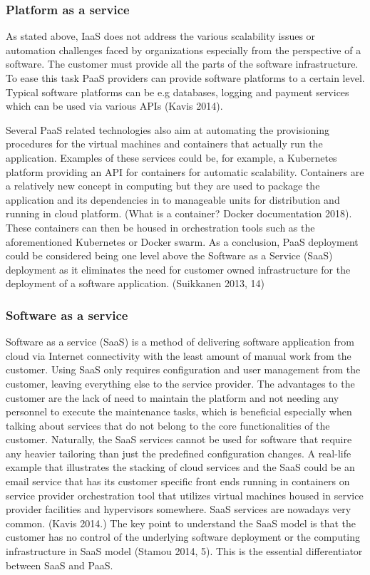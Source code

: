\documentclass{article}
\begin{document}
\subsubsection{Platform as a service}
As stated above, IaaS does not address the various scalability issues or automation challenges faced by organizations especially from the perspective of a software. The customer must provide all the parts of the software infrastructure. To ease this task PaaS providers can provide software platforms to a certain level. Typical software platforms can be e.g databases, logging and payment services which can be used via various APIs (Kavis 2014).
\par
Several PaaS related technologies also aim at automating the provisioning procedures for the virtual machines and containers that actually run the application. Examples of these services could be, for example, a Kubernetes platform providing an API for containers for automatic scalability. Containers are a relatively new concept in computing but they are used to package the application and its dependencies in to manageable units for distribution and running in cloud platform. (What is a container? Docker documentation 2018). These containers can then be housed in orchestration tools such as the aforementioned Kubernetes or Docker swarm.
As a conclusion, PaaS deployment could be considered being one level above the Software as a Service (SaaS) deployment as it eliminates the need for customer owned infrastructure for the deployment of a software application. (Suikkanen 2013, 14)
\subsubsection{Software as a service}
Software as a service (SaaS) is a method of delivering software application from cloud via Internet connectivity with the least amount of manual work from the customer. Using SaaS only requires configuration and user management from the customer, leaving everything else to the service provider. The advantages to the customer are the lack of need to maintain the platform and not needing any personnel to execute the maintenance tasks, which is beneficial especially when talking about services that do not belong to the core functionalities of the customer. Naturally, the SaaS services cannot be used for software that require any heavier tailoring than just the predefined configuration changes.
A real-life example that illustrates the stacking of cloud services and the SaaS could be an email service that has its customer specific front ends running in containers on service provider orchestration tool that utilizes virtual machines housed in service provider facilities and hypervisors somewhere. SaaS services are nowadays very common. (Kavis 2014.)
The key point to understand the SaaS model is that the customer has no control of the underlying software deployment or the computing infrastructure in SaaS model (Stamou 2014, 5). This is the essential differentiator between SaaS and PaaS.
\end{document}
